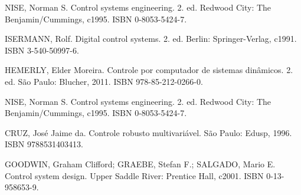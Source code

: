 {{    NISE, Norman S. Control systems engineering. 2. ed. Redwood City: The Benjamin/Cummings, c1995. ISBN 0-8053-5424-7.

    ISERMANN, Rolf. Digital control systems. 2. ed. Berlin: Springer-Verlag, c1991. ISBN 3-540-50997-6.

    HEMERLY, Elder Moreira. Controle por computador de sistemas dinâmicos. 2. ed. São Paulo: Blucher, 2011. ISBN 978-85-212-0266-0.

    NISE, Norman S. Control systems engineering. 2. ed. Redwood City: The Benjamin/Cummings, c1995. ISBN 0-8053-5424-7.

    CRUZ, José Jaime da. Controle robusto multivariável. São Paulo: Edusp, 1996. ISBN 9788531403413.

    GOODWIN, Graham Clifford; GRAEBE, Stefan F.; SALGADO, Mario E. Control system design. Upper Saddle River: Prentice Hall, c2001. ISBN 0-13-958653-9.}

}
